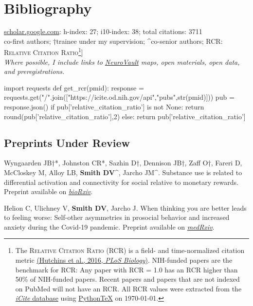 \documentclass[11pt, letterpaper]{article}
\newcommand{\biorxiv}[1]{\href{#1}{\textit{bioRxiv}}}
\newcommand{\medrxiv}[1]{\href{#1}{\textit{medRxiv}}}
\newcommand{\pytex}{Python\TeX}
\begin{document}
\section*{Bibliography}
\aiGoogleScholar \hspace{.01cm} \href{https://scholar.google.com/citations?user=czV7OcQAAAAJ&hl=en}{scholar.google.com}: h-index: 27; i10-index: 38; total citations: 3711 \\ 
\lbrack*co-first authors; †trainee under my supervision; \^{}co-senior authors; RCR: \textsc{Relative Citation Ratio}\footnote{The \textsc{Relative Citation Ratio} (RCR) is a field- and time-normalized citation metric \href{http://journals.plos.org/plosbiology/article?id=10.1371/journal.pbio.1002541}{(Hutchins et al., 2016, \textit{PLoS Biology})}. NIH-funded papers are the benchmark for RCR: Any paper with RCR = 1.0 has an RCR higher than 50\% of NIH-funded papers. Recent papers and papers that are not indexed on PubMed will not have an RCR. All RCR values were extracted from the \href{https://icite.od.nih.gov/stats}{\textit{iCite} database} using \href{https://github.com/gpoore/pythontex}{\pytex} on \today.}] \\ 

\textit{Where possible, I include links to \href{https://neurovault.org}{NeuroVault} maps, open materials, open data, and preregistrations.}


\begin{pycode}
import requests
def get_rcr(pmid):
  response = requests.get("/".join(["https://icite.od.nih.gov/api","pubs",str(pmid)]))
  pub = response.json()
  if pub['relative_citation_ratio'] is not None:
    return round(pub['relative_citation_ratio'],2)
  else:
    return pub['relative_citation_ratio']
\end{pycode}


\subsection*{Preprints Under Review}

\begin{hangparas}{.5in}{1}

Wyngaarden JB†*, Johnston CR*, Sazhin D†, Dennison JB†, Zaff O†, Fareri D, McCloskey M, Alloy LB, \textbf{Smith DV}\^{}, Jarcho JM\^{}. Substance use is related to differential activation and connectivity for social relative to monetary rewards. Preprint available on \biorxiv{https://doi.org/10.1101/2023.01.17.524305}.

Helion C, Ulichney V, \textbf{Smith DV}, Jarcho J. When thinking you are better leads to feeling worse: Self-other asymmetries in prosocial behavior and increased anxiety during the Covid-19 pandemic. Preprint available on \medrxiv{https://doi.org/10.1101/2021.02.26.21252547}. \\ 



\end{hangparas}
\end{document}
